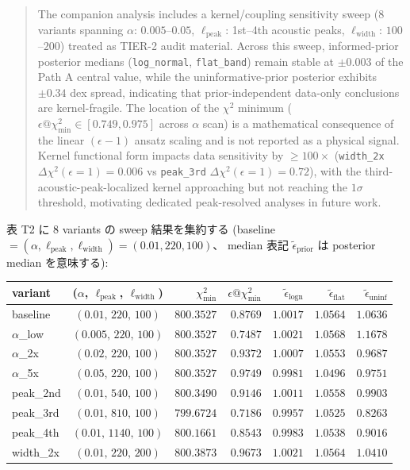 \documentclass[11pt,a4paper]{ltjsarticle}
\begin{document}
\begin{quote}
The companion analysis includes a kernel/coupling sensitivity sweep
(8 variants spanning $\alpha$: $0.005$--$0.05$, $\ell_{\mathrm{peak}}$:
1st--4th acoustic peaks, $\ell_{\mathrm{width}}$: $100$--$200$) treated
as TIER-2 audit material. Across this sweep, informed-prior posterior
medians (\texttt{log\_normal}, \texttt{flat\_band}) remain stable at
$\pm 0.003$ of the Path A central value, while the uninformative-prior
posterior exhibits $\pm 0.34$ dex spread, indicating that
prior-independent data-only conclusions are kernel-fragile. The location
of the $\chi^2$ minimum
($\epsilon@\chi^2_{\mathrm{min}} \in [0.749, 0.975]$ across $\alpha$ scan)
is a mathematical consequence of the linear $(\epsilon - 1)$ ansatz
scaling and is not reported as a physical signal. Kernel functional form
impacts data sensitivity by $\geq 100\times$ (\texttt{width\_2x}
$\Delta\chi^2(\epsilon = 1) = 0.006$ vs \texttt{peak\_3rd}
$\Delta\chi^2(\epsilon = 1) = 0.72$), with the third-acoustic-peak-localized
kernel approaching but not reaching the $1\sigma$ threshold, motivating
dedicated peak-resolved analyses in future work.
\end{quote}

\noindent
表 T2 に 8 variants の sweep 結果を集約する (baseline $= (\alpha, \ell_{\mathrm{peak}}, \ell_{\mathrm{width}}) = (0.01, 220, 100)$、
median 表記 $\tilde{\epsilon}_{\mathrm{prior}}$ は posterior median を意味する):

\begin{center}\footnotesize
\begin{tabular}{@{}lcrrrrr@{}}
\toprule
variant & ($\alpha$, $\ell_{\mathrm{peak}}$, $\ell_{\mathrm{width}}$)
        & $\chi^2_{\mathrm{min}}$ & $\epsilon@\chi^2_{\mathrm{min}}$
        & $\tilde{\epsilon}_{\mathrm{logn}}$ & $\tilde{\epsilon}_{\mathrm{flat}}$ & $\tilde{\epsilon}_{\mathrm{uninf}}$ \\
\midrule
baseline       & $(0.01,\, 220,\, 100)$  & $800.3527$ & $0.8769$ & $1.0017$ & $1.0564$ & $1.0636$ \\
$\alpha$\_low  & $(0.005,\, 220,\, 100)$ & $800.3527$ & $0.7487$ & $1.0021$ & $1.0568$ & $1.1678$ \\
$\alpha$\_2x   & $(0.02,\, 220,\, 100)$  & $800.3527$ & $0.9372$ & $1.0007$ & $1.0553$ & $0.9687$ \\
$\alpha$\_5x   & $(0.05,\, 220,\, 100)$  & $800.3527$ & $0.9749$ & $0.9981$ & $1.0496$ & $0.9751$ \\
peak\_2nd      & $(0.01,\, 540,\, 100)$  & $800.3490$ & $0.9146$ & $1.0011$ & $1.0558$ & $0.9903$ \\
peak\_3rd      & $(0.01,\, 810,\, 100)$  & $799.6724$ & $0.7186$ & $0.9957$ & $1.0525$ & $0.8263$ \\
peak\_4th      & $(0.01,\, 1140,\, 100)$ & $800.1661$ & $0.8543$ & $0.9983$ & $1.0538$ & $0.9016$ \\
width\_2x      & $(0.01,\, 220,\, 200)$  & $800.3873$ & $0.9673$ & $1.0021$ & $1.0564$ & $1.0410$ \\
\bottomrule
\end{tabular}
\end{center}
\end{document}
